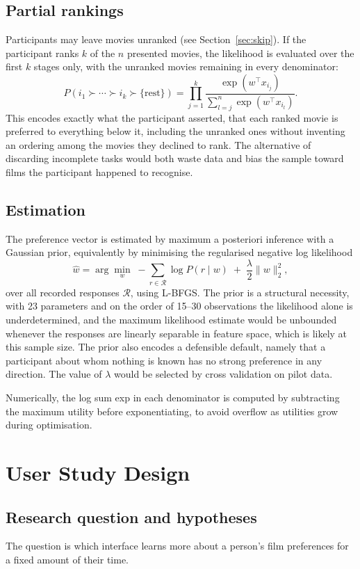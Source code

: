 \documentclass[11pt]{article}
\begin{document}
\subsection{Partial rankings}
Participants may leave movies unranked (see Section~\ref{sec:skip}). If the participant ranks $k$ of the $n$ presented movies, the likelihood is evaluated over the first $k$ stages only, with the unranked movies remaining in every denominator:
\[
P(i_1 \succ \cdots \succ i_k \succ \{\text{rest}\})
= \prod_{j=1}^{k} \frac{\exp(w^\top x_{i_j})}{\sum_{l=j}^{n} \exp(w^\top x_{i_l})}.
\]
This encodes exactly what the participant asserted, that each ranked movie is preferred to everything below it, including the unranked ones without inventing an ordering among the movies they declined to rank. The alternative of discarding incomplete tasks would both waste data and bias the sample toward films the participant happened to recognise.

\subsection{Estimation}
\label{sec:estimation}
The preference vector is estimated by maximum a posteriori inference with a Gaussian prior, equivalently by minimising the regularised negative log likelihood
\[
\hat{w} = \arg\min_w \; -\sum_{r \in \mathcal{R}} \log P(r \mid w) \;+\; \frac{\lambda}{2}\|w\|_2^2 ,
\]
over all recorded responses $\mathcal{R}$, using L-BFGS. The prior is a structural necessity, with 23 parameters and on the order of 15--30 observations the likelihood alone is underdetermined, and the maximum likelihood estimate would be unbounded whenever the responses are linearly separable in feature space, which is likely at this sample size. The prior also encodes a defensible default, namely that a participant about whom nothing is known has no strong preference in any direction. The value of $\lambda$ would be selected by cross validation on pilot data.

Numerically, the log sum exp in each denominator is computed by subtracting the maximum utility before exponentiating, to avoid overflow as utilities grow during optimisation.

\section{User Study Design}
\label{sec:study}

\subsection{Research question and hypotheses}
The question is which interface learns more about a person's film preferences for a fixed amount of their time.
\end{document}
